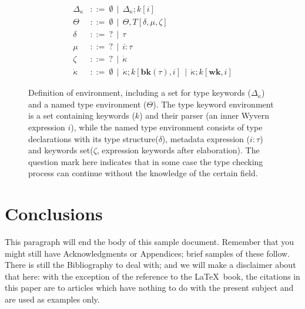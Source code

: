 \documentclass{sig-alternate}
\begin{document}
\begin{figure}[ht]
\begin{align*}
  \Delta_{\kappa} &::=~ \emptyset ~~ | ~~ \Delta_{\kappa};k[i]\\
  \Theta &::=~ \emptyset ~~ | ~~ \Theta,T[\delta,\mu,\zeta] \\
  \delta &::=~ ? ~~ | ~~ \tau\\
  \mu    &::=~ ? ~~ | ~~ i:\tau\\
  \zeta  &::=~ ? ~~ | ~~ \dot\kappa\\
  \dot\kappa        &::=~ \emptyset ~~ | ~~ \dot\kappa;k[\mathbf{bk}(\tau),i] ~~ | ~~ \dot\kappa;k[\mathbf{wk},i]
\end{align*}
\vspace{-8px}
\caption{Definition of environment, including a set for type keywords ($\Delta_{\kappa}$) and a named type environment ($\Theta$). The type keyword environment is a set containing keywords ($k$) and their parser (an inner Wyvern expression $i$), while the named type environment consists of type declarations with its type structure($\delta$), metadata expression ($i:\tau$) and keywords set($\zeta$, expression keywords after elaboration). The question mark here indicates that in some case the type checking process can continue without the knowledge of the certain field.}
\vspace{-10px}
\label{typechecking-environment}
\end{figure}









\section{Conclusions}
This paragraph will end the body of this sample document.
Remember that you might still have Acknowledgments or
Appendices; brief samples of these
follow.  There is still the Bibliography to deal with; and
we will make a disclaimer about that here: with the exception
of the reference to the \LaTeX\ book, the citations in
this paper are to articles which have nothing to
do with the present subject and are used as
examples only.

\end{document}
